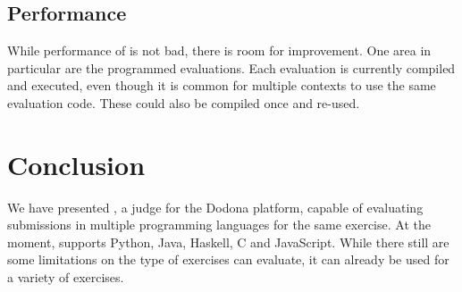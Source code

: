 \documentclass[5p,number]{elsarticle}
\begin{document}
    \subsection{Performance}\label{subsec:performance}

    While performance of \tested{} is not bad, there is room for improvement.
    One area in particular are the programmed evaluations.
    Each evaluation is currently compiled and executed, even though it is common for multiple contexts to use the same evaluation code.
    These could also be compiled once and re-used.
    
    \section{Conclusion}\label{sec:conclusion}
    
    We have presented \tested{}, a judge for the Dodona platform, capable of evaluating submissions in multiple programming languages for the same exercise.
    At the moment, \tested{} supports Python, Java, Haskell, C and JavaScript.
    While there still are some limitations on the type of exercises \tested{} can evaluate, it can already be used for a variety of exercises.

    
    
\end{document}

